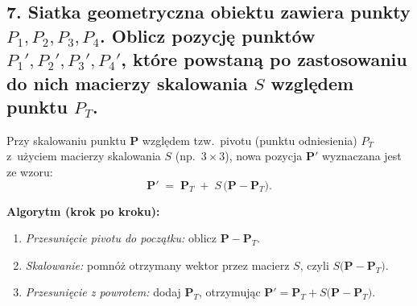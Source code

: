\subsection*{7. Siatka geometryczna obiektu zawiera punkty \( P_1, P_2, P_3, P_4 \). Oblicz pozycję punktów \( P_1', P_2', P_3', P_4' \), które powstaną po zastosowaniu do nich macierzy skalowania \( S \) względem punktu \( P_T \).}

\noindent
Przy skalowaniu punktu $\mathbf{P}$ względem tzw.\ pivotu (punktu odniesienia) $P_T$
z~użyciem macierzy skalowania $S$ (np.\ $3\times 3$), nowa pozycja $\mathbf{P}'$ wyznaczana jest ze wzoru:
\[
\mathbf{P}' 
\;=\;
\mathbf{P}_T \;+\; S\,\bigl(\mathbf{P} - \mathbf{P}_T\bigr).
\]

\medskip
\noindent
\textbf{Algorytm (krok po kroku):}
\begin{enumerate}
    \item \emph{Przesunięcie pivotu do początku:} oblicz $\mathbf{P} - \mathbf{P}_T$.
    \item \emph{Skalowanie:} pomnóż otrzymany wektor przez macierz $S$, czyli 
          $S \bigl(\mathbf{P} - \mathbf{P}_T\bigr)$.
    \item \emph{Przesunięcie z powrotem:} dodaj $\mathbf{P}_T$,
          otrzymując $\mathbf{P}' = \mathbf{P}_T + S\bigl(\mathbf{P} - \mathbf{P}_T\bigr)$.
\end{enumerate}


